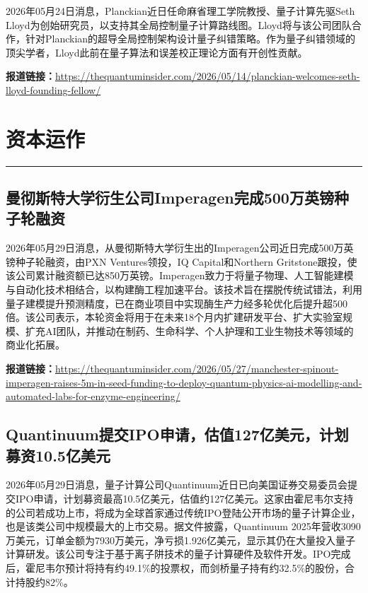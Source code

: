 \documentclass[12pt,a4paper]{ctexart}
\begin{document}
2026年05月24日消息，Planckian近日任命麻省理工学院教授、量子计算先驱Seth Lloyd为创始研究员，以支持其全局控制量子计算路线图。Lloyd将与该公司团队合作，针对Planckian的超导全局控制架构设计量子纠错策略。作为量子纠错领域的顶尖学者，Lloyd此前在量子算法和误差校正理论方面有开创性贡献。

\noindent\textbf{报道链接：}\url{https://thequantuminsider.com/2026/05/14/planckian-welcomes-seth-lloyd-founding-fellow/}


\newpage
\section{资本运作}
\vspace{-0.5em}
\noindent\rule{\linewidth}{1.5pt}

\subsection{ 曼彻斯特大学衍生公司Imperagen完成500万英镑种子轮融资 }

2026年05月29日消息，从曼彻斯特大学衍生出的Imperagen公司近日完成500万英镑种子轮融资，由PXN Ventures领投，IQ Capital和Northern Gritstone跟投，使该公司累计融资额已达850万英镑。Imperagen致力于将量子物理、人工智能建模与自动化技术相结合，以构建酶工程加速平台。该技术旨在摆脱传统试错法，利用量子建模提升预测精度，已在商业项目中实现酶生产力经多轮优化后提升超500倍。该公司表示，本轮资金将用于在未来18个月内扩建研发平台、扩大实验室规模、扩充AI团队，并推动在制药、生命科学、个人护理和工业生物技术等领域的商业化拓展。

\noindent\textbf{报道链接：}\url{https://thequantuminsider.com/2026/05/27/manchester-spinout-imperagen-raises-5m-in-seed-funding-to-deploy-quantum-physics-ai-modelling-and-automated-labs-for-enzyme-engineering/}

\subsection{ Quantinuum提交IPO申请，估值127亿美元，计划募资10.5亿美元 }

2026年05月29日消息，量子计算公司Quantinuum近日已向美国证券交易委员会提交IPO申请，计划募资最高10.5亿美元，估值约127亿美元。这家由霍尼韦尔支持的公司若成功上市，将成为全球首家通过传统IPO登陆公开市场的量子计算企业，也是该类公司中规模最大的上市交易。据文件披露，Quantinuum 2025年营收3090万美元，订单金额为7930万美元，净亏损1.926亿美元，显示其仍在大量投入量子计算研发。该公司专注于基于离子阱技术的量子计算硬件及软件开发。IPO完成后，霍尼韦尔预计将持有约49.1\%的投票权，而剑桥量子持有约32.5\%的股份，合计持股约82\%。
\end{document}
